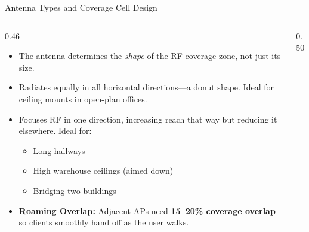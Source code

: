 \documentclass[aspectratio=169]{beamer}
\begin{document}
\begin{frame}{Antenna Types and Coverage Cell Design}
    \begin{columns}[T]
        \begin{column}{0.46\textwidth}
            \footnotesize
            \begin{itemize}
                \item The antenna determines the \emph{shape} of the RF coverage zone, not just its size.
                \item {} Radiates equally in all horizontal directions---a donut shape. Ideal for ceiling mounts in open-plan offices.
                \item {} Focuses RF in one direction, increasing reach that way but reducing it elsewhere. Ideal for:
                    \begin{itemize}
                        \item Long hallways
                        \item High warehouse ceilings (aimed down)
                        \item Bridging two buildings
                    \end{itemize}
                \item \textbf{Roaming Overlap:} Adjacent APs need \textbf{15--20\% coverage overlap} so clients smoothly hand off as the user walks.
            \end{itemize}
        \end{column}
        \begin{column}{0.50\textwidth}
            \begin{center}
\end{center}
\end{column}
\end{columns}
\end{frame}
\end{document}
